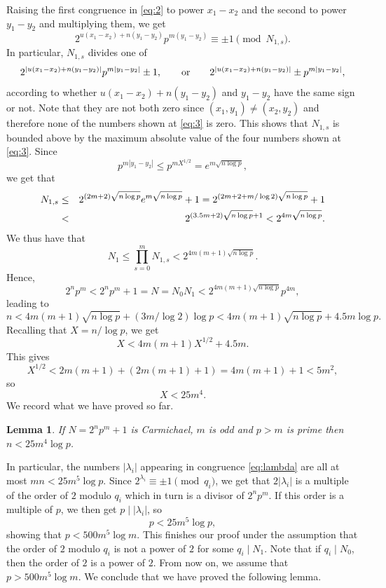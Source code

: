 \documentclass[11pt]{article}
\newtheorem{lemma}[lem]{Lemma}
\def\\{\cr}
\begin{document}
Raising the first congruence in \eqref{eq:2} to power $x_1-x_2$ and the second to power $y_1-y_2$ and multiplying them, we get 
$$
2^{u(x_1-x_2)+n(y_1-y_2)} p^{m(y_1-y_2)}\equiv \pm 1\pmod {N_{1,s}}.
$$ 
In particular, $N_{1,s}$ divides one of 
\begin{equation}
\label{eq:3}
2^{|u(x_1-x_2)+n(y_1-y_2)|} p^{m|y_1-y_2|}\pm 1,\qquad {\text{\rm or}}\qquad 2^{|u(x_1-x_2)+n(y_1-y_2)|}\pm p^{m|y_1-y_2|},
\end{equation}
according to whether $u(x_1-x_2)+n(y_1-y_2)$ and $y_1-y_2$ have the same sign or not. Note that they are not both zero since $(x_1,y_1)\ne (x_2,y_2)$ and therefore none of the numbers shown at \eqref{eq:3} is zero. 
This shows that $N_{1,s}$ is bounded above by the maximum absolute value of the four numbers shown at \eqref{eq:3}. Since 
$$
p^{m|y_1-y_2|}\le p^{mX^{1/2}}=e^{m{\sqrt{n\log p}}},
$$
we get that 
\begin{eqnarray*}
N_{1,s} & \le  & 2^{(2m+2){\sqrt{n\log p}}} e^{m{\sqrt{n\log p}}}+1=2^{(2m+2+m/\log 2){\sqrt{n\log p}}}+1\\
& < & 2^{(3.5m+2){\sqrt{n\log p}}+1}<2^{4m{\sqrt{n\log p}}}.
\end{eqnarray*}
We thus have that 
$$
N_1\le \prod_{s=0}^m N_{1,s}<2^{4m(m+1){\sqrt{n\log p}}}.
$$
Hence, 
$$
2^np^m<2^np^m+1=N=N_0N_1< 2^{4m(m+1){\sqrt{n\log p}}} p^{4m},
$$
leading to 
$$
n<4m(m+1){\sqrt{n\log p}}+(3m/\log 2)\log p<4m(m+1){\sqrt{n\log p}}+4.5m\log p.
$$
Recalling that $X=n/\log p$, we get  
$$
X<4m(m+1)X^{1/2}+4.5m.
$$
This gives 
$$
X^{1/2}<2m(m+1)+(2m(m+1)+1)=4m(m+1)+1<5m^2,
$$
so
$$
X<25m^4.
$$
We record what we have proved so far.

\begin{lemma}
\label{lem:n}
If $N=2^np^m+1$ is Carmichael, $m$ is odd and $p>m$ is prime then $n<25m^4\log p$. 
\end{lemma}

In particular, the  numbers $|\lambda_{i}|$ appearing in congruence \eqref{eq:lambda} are all at most $mn<25m^5\log p$. Since $2^{\lambda_{i}}\equiv \pm 1\pmod {q_i}$, we get that 
$2|\lambda_{i}|$ is a multiple of the order of $2$ modulo $q_i$ which in turn is a divisor of $2^np^m$. If this order is a multiple of $p$, we then get $p\mid |\lambda_{i}|$, so 
$$
p<25m^5\log p,
$$
showing that $p< 500m^5\log m$. This finishes our proof under the assumption that the order of $2$ modulo $q_i$ is not a power of $2$ for some $q_i\mid N_1$. 
Note that if $q_i\mid N_0$, then the order of $2$ is a power of $2$. From now on, we assume that $p>500m^5\log m$. We conclude that we have proved the following lemma.
\end{document}
